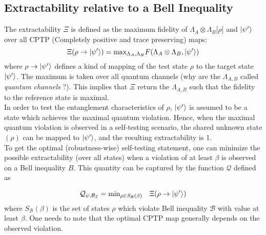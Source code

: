 \documentclass[12pt]{article}
\begin{document}
	\newpage

\subsection{Extractability relative to a Bell Inequality}

The extractability $\Xi$ is defined as the maximum fidelity of $\Lambda_A
\otimes \Lambda_B \big[\rho\big]$ and $\ket{\psi'}$ over all CPTP (Completely
positive and trace preserving) maps:
\begin{equation}
	\Xi (\rho \rightarrow \ket{\psi'}) =
	\text{max}_{\Lambda_A ,\Lambda_B} F(\Lambda_A \otimes \Lambda_B, \ket{\psi'})
\end{equation}
where $\rho \rightarrow \ket{\psi'}$ defines a kind of mapping of the test state
$\rho$ to the target state $\ket{\psi'}$. The maximum is taken over all quantum
channels (why are the $\Lambda_{A,B}$ called \textit{quantum channels} ?). This
implies that $\Xi$ return the $\Lambda_{A,B}$ such that the fidelity to the
reference state is maximal.
\\\noindent
In order to test the entanglement characteristics of $\rho$, $\ket{\psi'}$ is
assumed to be a state which achieves the maximal quantum violation. Hence, when
the maximal quantum violation is observed in a self-testing scenario, the shared
unknown state $(\rho)$ can be mapped to $\ket{\psi'}$, and the resulting
extractability is 1.
\\\noindent
To get the optimal (robustness-wise) self-testing statement, one can minimize
the possible extractability (over all states) when a violation of at least
$\beta$ is observed on a Bell inequality $B$. This quantity can be captured by
the function $\mathcal{Q}$ defined as

\begin{equation}
	\mathcal{Q}_{\psi,\mathcal{B}_\mathcal{I}} = \text{min}_{\rho \in
	S_\mathcal{B}(\beta)} \quad \Xi (\rho \rightarrow \ket{\psi'})
\end{equation}
where $S_\mathcal{B}(\beta)$ is the set of states $\rho$ which violate Bell
inequality $\mathcal B$ with value at least $\beta$.  One needs to note that the
optimal CPTP map generally depends on the observed violation.

\newpage



\end{document}
